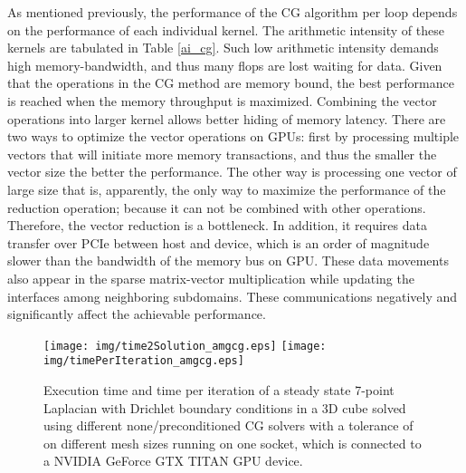 \documentclass[3p,times]{elsarticle}
\begin{document}
As mentioned previously, the performance of the CG algorithm per loop depends on the performance of each individual kernel. The arithmetic intensity of these kernels are tabulated in Table \ref{ai_cg}. Such low arithmetic intensity demands high memory-bandwidth, and thus many flops are lost waiting for data. Given that the operations in the CG method are memory bound, the best performance is reached when the memory throughput is maximized. Combining the vector operations into larger kernel allows better hiding of memory latency. There are two ways to optimize the vector operations on GPUs: first by processing multiple vectors that will initiate more memory transactions, and thus the smaller the vector size the better the performance. The other way is processing one vector of large size that is, apparently, the only way to maximize the performance of the reduction operation; because it can not be combined with other operations. Therefore, the vector reduction is a bottleneck. In addition, it requires data transfer over PCIe between host and device, which is an order of magnitude slower than the bandwidth of the memory bus on GPU. These data movements also appear in the sparse matrix-vector multiplication while updating the interfaces among neighboring subdomains. These communications negatively and significantly affect the achievable performance.     
~\\



\begin{figure}[h!]
\begin{center}
\emph{} \texttt{[image: img/time2Solution\_amgcg.eps]}
\emph{} \texttt{[image: img/timePerIteration\_amgcg.eps]}
\caption{Execution time and time per iteration of a steady state 7-point Laplacian with Drichlet boundary conditions in a 3D cube solved using different none/preconditioned CG solvers with a tolerance of  on different mesh sizes running on one socket, which is connected to a NVIDIA GeForce GTX TITAN GPU device.}
\label{pcgs1}
\end{center}
\end{figure} 
\end{document}
